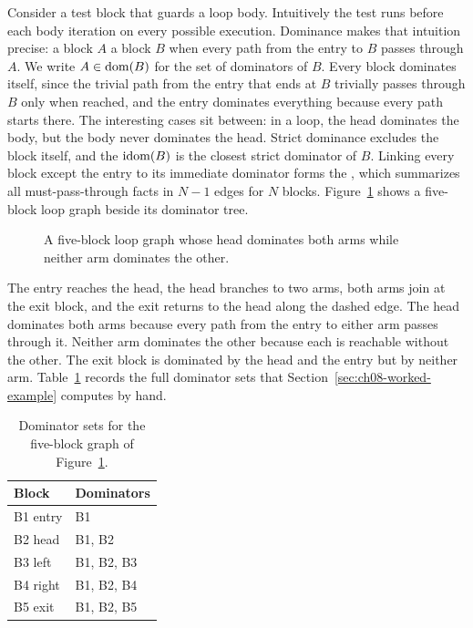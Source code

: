 Consider a test block that guards a loop body.
Intuitively the test runs before each body iteration on every possible execution.
Dominance makes that intuition precise: a block $A$  a block $B$ when every path from the entry to $B$ passes through $A$.
We write $A \in \operatorname{dom}(B)$ for the set of dominators of $B$.
Every block dominates itself, since the trivial path from the entry that ends at $B$ trivially passes through $B$ only when reached, and the entry dominates everything because every path starts there.
The interesting cases sit between: in a loop, the head dominates the body, but the body never dominates the head.
Strict dominance excludes the block itself, and the  $\operatorname{idom}(B)$ is the closest strict dominator of $B$.
Linking every block except the entry to its immediate dominator forms the , which summarizes all must-pass-through facts in $N - 1$ edges for $N$ blocks.
Figure~\ref{fig:ch08-cfg-domtree} shows a five-block loop graph beside its dominator tree.
\begin{figure}
\centering
{}
\caption{A five-block loop graph whose head dominates both arms while neither arm dominates the other.}
\label{fig:ch08-cfg-domtree}
\end{figure}
The entry reaches the head, the head branches to two arms, both arms join at the exit block, and the exit returns to the head along the dashed edge.
The head dominates both arms because every path from the entry to either arm passes through it.
Neither arm dominates the other because each is reachable without the other.
The exit block is dominated by the head and the entry but by neither arm.
Table~\ref{tab:ch08-domsets} records the full dominator sets that Section~\ref{sec:ch08-worked-example} computes by hand.
\begin{table}
\caption{Dominator sets for the five-block graph of Figure~\ref{fig:ch08-cfg-domtree}.}
\label{tab:ch08-domsets}
\centering
\begin{tabular}{ll}
\toprule
Block & Dominators \\
\midrule
B1 entry & B1 \\
B2 head & B1, B2 \\
B3 left & B1, B2, B3 \\
B4 right & B1, B2, B4 \\
B5 exit & B1, B2, B5 \\
\bottomrule
\end{tabular}
\end{table}
